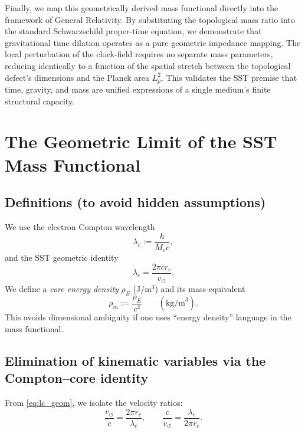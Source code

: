 \documentclass[11pt, a4paper]{article}
\begin{document}
            Finally, we map this geometrically derived mass functional directly into the framework of General Relativity. By substituting the topological mass ratio into the standard Schwarzschild proper-time equation, we demonstrate that gravitational time dilation operates as a pure geometric impedance mapping. The local perturbation of the clock-field requires no separate mass parameters, reducing identically to a function of the spatial stretch between the topological defect's dimensions and the Planck area $L_p^2$. This validates the SST premise that time, gravity, and mass are unified expressions of a single medium's finite structural capacity.
        
        \section{The Geometric Limit of the SST Mass Functional}
            
            \subsection{Definitions (to avoid hidden assumptions)}
                We use the electron Compton wavelength
                \begin{equation}
                    \lambda_c := \frac{h}{M_e c},
                \end{equation}
                and the SST geometric identity
                \begin{equation}
                    \lambda_c = \frac{2\pi c r_c}{v_{\circlearrowleft}}.
                    \label{eq:lc_geom}
                \end{equation}
                We define a \emph{core energy density} $\rho_E$ (J/m$^3$) and its mass-equivalent
                \begin{equation}
                    \rho_m := \frac{\rho_E}{c^2} \qquad (\text{kg/m}^3).
                \end{equation}
                This avoids dimensional ambiguity if one uses ``energy density'' language in the mass functional.
            
            \subsection{Elimination of kinematic variables via the Compton--core identity}
                From \eqref{eq:lc_geom}, we isolate the velocity ratios:
                \begin{equation}
                    \frac{v_{\circlearrowleft}}{c}=\frac{2\pi r_c}{\lambda_c},
                    \qquad
                    \frac{c}{v_{\circlearrowleft}}=\frac{\lambda_c}{2\pi r_c}.
                    \label{eq:vratio}
                \end{equation}
            
\end{document}
